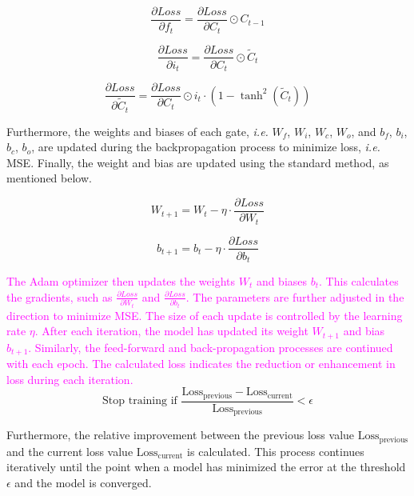 \documentclass[journal]{IEEEtran}
\begin{document}
\begin{equation}\label{forget gate gradient}
    \frac{\partial Loss}{\partial f_t} = \frac{\partial Loss}{\partial C_t} \odot C_{t-1}
\end{equation}

\begin{equation}\label{input gate gradient}
    \frac{\partial Loss}{\partial i_t} = \frac{\partial Loss}{\partial C_t} \odot \tilde{C}_t
\end{equation}


\begin{equation}\label{candidate cell state gradient}
    \frac{\partial Loss}{\partial \tilde{C}_t} = \frac{\partial Loss}{\partial C_t} \odot i_t \cdot (1 - \tanh^2(\tilde{C}_t))
\end{equation}

Furthermore, the weights and biases of each gate, \textit{i.e.} $W_f$, $W_i$, $W_c$, $W_o$, and $b_f$, $b_i$, $b_c$, $b_o$, are updated during the backpropagation process to minimize loss, \textit{i.e.} MSE. Finally, the weight and bias are updated using the standard method, as mentioned below.

\begin{equation}\label{weights update}
    W_{t+1} = W_t - \eta \cdot \frac{\partial Loss}{\partial W_t}
\end{equation}


\begin{equation} \label{bais update}
    b_{t+1} = b_t - \eta \cdot \frac{\partial Loss}{\partial b_t}
\end{equation}

\textcolor{magenta}{The Adam optimizer then updates the weights $W_t$ and biases $b_t$. This calculates the gradients, such as $\frac{\partial Loss}{\partial W_t}$ and $\frac{\partial Loss}{\partial b_t}$. The parameters are further adjusted in the direction to minimize
MSE. The size of each update is controlled by the learning rate $\eta$. After each iteration, the
model has updated its weight $W_{t+1}$ and bias $b_{t+1}$.
Similarly, the feed-forward and back-propagation processes are continued with each epoch. The calculated loss indicates the reduction or enhancement in loss during each iteration.}
\begin{equation}\label{convergence}
\text{Stop training if } \frac{\text{Loss}_{\text{previous}} - \text{Loss}_{\text{current}}}{\text{Loss}_{\text{previous}}} < \epsilon
\end{equation}

Furthermore, the relative improvement between the previous loss value ${\text{Loss}_{\text{previous}}}$ and the current loss value ${\text{Loss}_{\text{current}}}$ is calculated.  
This process continues iteratively until the point when a model has minimized the error at the threshold $\epsilon$ and the model is converged.
\end{document}
